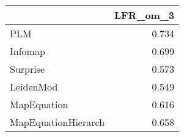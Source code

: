 \begin{tabular}{lr}
\toprule
{} & LFR_om_3 \\
\midrule
PLM                 &    0.734 \\
Infomap             &    0.699 \\
Surprise            &    0.573 \\
LeidenMod           &    0.549 \\
MapEquation         &    0.616 \\
MapEquationHierarch &    0.658 \\
\bottomrule
\end{tabular}

